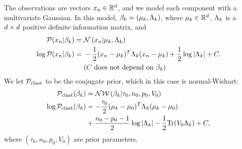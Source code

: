 \begin{ex}
%
The observations are vectors $x_n \in \mathbb{R}^d$,
and we model each component with a multivariate Gaussian.
In this model, $\beta_k = (\mu_k, \Lambda_k)$,
where $\mu_k \in \mathbb{R}^d$, $\Lambda_k$ is a $d\times d$ positive
definite information matrix, and
%
\begin{align*}
%
\p(\x_\n \vert \beta_\k) ={}& \normdist{\x_n \vert \mu_\k, \Lambda_\k} \\
\logp(\x_\n \vert \beta_\k) ={}&
    -\frac{1}{2}(\x_n - \mu_k)^T \Lambda_\k (\x_n - \mu_k)
    + \frac{1}{2} \log |\Lambda_\k| + \const.\\
    & \constdesc{\beta_\k}
%
\end{align*}
We let $\mathcal{P}_{\mathrm{clust}}$ to be the conjugate prior, which in this case is normal-Wishart:
\begin{align*}
  \mathcal{P}_{\mathrm{clust}}(\beta_k) &= \mathcal{N}\mathcal{W}\left(\beta_k \vert \tau_0, n_0, p_0, V_0\right)\\
  \log\mathcal{P}_{\mathrm{clust}}(\beta_k) &=
      -\frac{\tau_0}{2}(\mu_k - \mu_0)^T \Lambda_k (\mu_k - \mu_0)\\
      &{} + \frac{n_0 - p_0 - 1}{2} \log |\Lambda_k| -
      \frac{1}{2} \textrm{Tr}(V_0 \Lambda_k) + C,
\end{align*}
where $(\tau_0, n_0, p_0, V_0)$ are prior parameters.


%
\end{ex}

